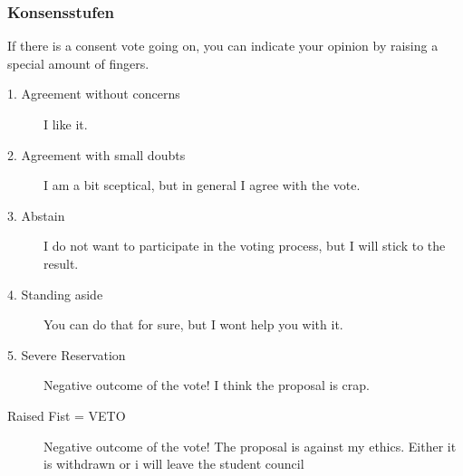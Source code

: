 \vspace*{-2em}

\subsubsection*{Konsensstufen}
\footnotesize
If there is a consent vote going on, you can indicate your opinion by raising a special amount of fingers.
\begin{description}
\item[1. Agreement without concerns] I like it.
\item[2. Agreement with small doubts] I am a bit sceptical, but in general I agree with the vote.
\item[3. Abstain] I do not want to participate in the voting process, but I will stick to the result.
\item[4. Standing aside] You can do that for sure, but I wont help you with it.
\item[5. Severe Reservation] Negative outcome of the vote! I think the proposal is crap.
\item[Raised Fist = VETO] Negative outcome of the vote! The proposal is against my ethics. Either it is withdrawn or i will leave the student council
\end{description}

